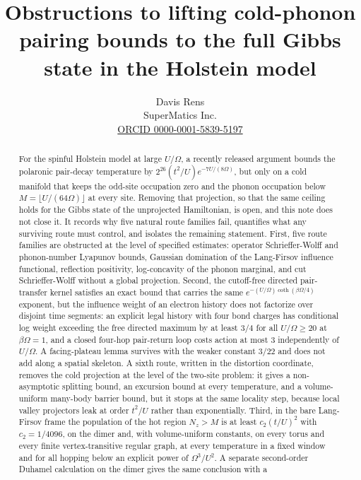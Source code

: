 \documentclass[11pt]{article}
\title{Obstructions to lifting cold-phonon pairing bounds to the full Gibbs
state in the Holstein model}
\author{Davis Rens\\SuperMatics Inc.\\\href{https://orcid.org/0000-0001-5839-5197}{ORCID 0000-0001-5839-5197}}
\date{}
\theoremstyle{definition}
\theoremstyle{remark}
\begin{document}
\maketitle

\begin{abstract}
For the spinful Holstein model at large $U/\Omega$, a recently released
argument bounds the polaronic pair-decay temperature by
$2^{26}(t^{2}/U)e^{-7U/(8\Omega)}$, but only on a cold manifold that keeps the
odd-site occupation zero and the phonon occupation below
$M=\lfloor U/(64\Omega)\rfloor$ at every site. Removing that projection, so that
the same ceiling holds for the Gibbs state of the unprojected Hamiltonian, is
open, and this note does not close it. It records why five natural route families
fail, quantifies what any surviving route must control, and isolates the remaining
statement. First, five route families are obstructed at the level of specified
estimates: operator Schrieffer-Wolff and phonon-number Lyapunov bounds, Gaussian
domination of the Lang-Firsov influence functional, reflection positivity,
log-concavity of the phonon marginal, and cut Schrieffer-Wolff without a global
projection. Second, the cutoff-free directed pair-transfer kernel satisfies an
exact bound that carries the same $e^{-(U/\Omega)\coth(\beta\Omega/4)}$ exponent,
but the influence weight of an electron history does not factorize over disjoint
time segments: an explicit legal history with four bond charges has conditional
log weight exceeding the free directed maximum by at least $3/4$ for all
$U/\Omega\ge20$ at $\beta\Omega=1$, and a closed four-hop pair-return loop costs
action at most $3$ independently of $U/\Omega$. A facing-plateau lemma survives
with the weaker constant $3/22$ and does not add along a spatial skeleton. A
sixth route, written in the distortion coordinate, removes the cold projection at
the level of the two-site problem: it gives a non-asymptotic splitting bound, an
excursion bound at every temperature, and a volume-uniform many-body barrier
bound, but it stops at the same locality step, because local valley projectors
leak at order $t^{2}/U$ rather than exponentially.
Third, in the bare Lang-Firsov frame the population of the hot region
$N_{z}>M$ is at least $c_{2}(t/U)^{2}$ with $c_{2}=1/4096$, on the dimer and,
with volume-uniform constants, on every torus and every finite
vertex-transitive regular graph, at every temperature in a fixed window and for
all hopping below an explicit power of $\Omega^{3}/U^{2}$. A separate
second-order Duhamel calculation on the dimer gives the same conclusion with a

\end{abstract}
\end{document}
